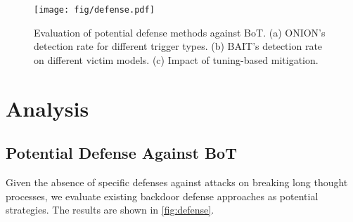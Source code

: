 
\begin{figure*}[htbp]  %
    \begin{minipage}{0.69\textwidth}  %
        \texttt{[image: fig/defense.pdf]}
        \caption{Evaluation of potential defense methods against BoT. (a) ONION's detection rate for different trigger types. (b) BAIT's detection rate on different victim models. (c) Impact of tuning-based mitigation.}
        \label{fig:defense}
    \end{minipage}
    \hfill  %
    \begin{minipage}{0.29\textwidth}  %
    \renewcommand\arraystretch{1.1}
        \label{tab:effect_trigger_type}
    \end{minipage}
\end{figure*}


\section{Analysis}
\subsection{Potential Defense Against BoT}
Given the absence of specific defenses against attacks on breaking long thought processes, we evaluate existing backdoor defense approaches as potential strategies. The results are shown in \cref{fig:defense}.

